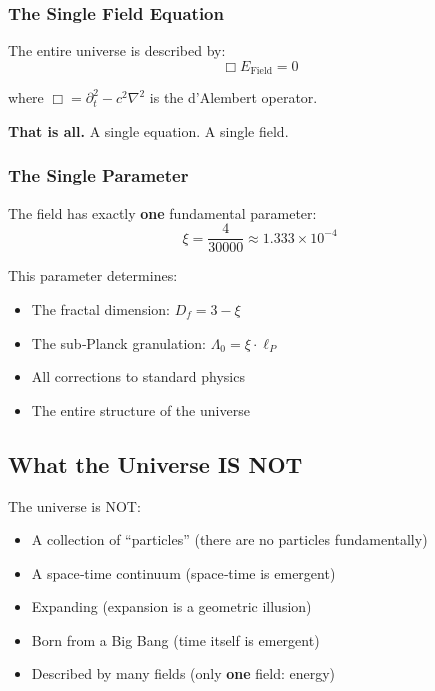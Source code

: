	\subsubsection{The Single Field Equation}

	The entire universe is described by:
	\begin{equation}
		\boxed{\Box E_{\text{Field}} = 0}
	\end{equation}

	where $\Box = \partial_t^2 - c^2 \nabla^2$ is the d’Alembert operator.

	\textbf{That is all.} A single equation. A single field.

	\subsubsection{The Single Parameter}

	The field has exactly \textbf{one} fundamental parameter:
	\begin{equation}
		\boxed{\xi = \frac{4}{30000} \approx 1.333 \times 10^{-4}}
	\end{equation}

	This parameter determines:
	\begin{itemize}
		\item The fractal dimension: $D_f = 3 - \xi$
		\item The sub‑Planck granulation: $\Lambda_0 = \xi \cdot \ell_P$
		\item All corrections to standard physics
		\item The entire structure of the universe
	\end{itemize}

	\subsection{What the Universe IS NOT}

	\begin{important}
		The universe is NOT:
		\begin{itemize}
			\item A collection of \enquote{particles} (there are no particles fundamentally)
			\item A space‑time continuum (space‑time is emergent)
			\item Expanding (expansion is a geometric illusion)
			\item Born from a Big Bang (time itself is emergent)
			\item Described by many fields (only \textbf{one} field: energy)
		\end{itemize}
	\end{important}

